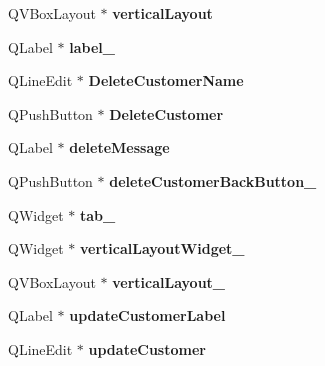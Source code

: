 \begin{DoxyCompactItemize}
\mbox{\label{class_ui___main_window_aecd96a04789fcfec3f98d80390ad8184}} 
Q\+V\+Box\+Layout $\ast$ {\bfseries vertical\+Layout}
\item 
\mbox{\label{class_ui___main_window_af183bfbfb9f38bbdd60caf92b15e23dc}} 
Q\+Label $\ast$ {\bfseries label\+\_}
\item 
\mbox{\label{class_ui___main_window_a0609806ecf470a0a506cff100a293f5c}} 
Q\+Line\+Edit $\ast$ {\bfseries Delete\+Customer\+Name}
\item 
\mbox{\label{class_ui___main_window_a5a892ebccf08983b3f64ebcf82b3c4ff}} 
Q\+Push\+Button $\ast$ {\bfseries Delete\+Customer}
\item 
\mbox{\label{class_ui___main_window_a50f57d40b6bc88b1f62d774daafa5ed0}} 
Q\+Label $\ast$ {\bfseries delete\+Message}
\item 
\mbox{\label{class_ui___main_window_a1bd01d0820b1695e67cf8a4ac5b920f9}} 
Q\+Push\+Button $\ast$ {\bfseries delete\+Customer\+Back\+Button\+\_}
\item 
\mbox{\label{class_ui___main_window_a41c7e77dd12b9445e13dbe8fb5ae1488}} 
Q\+Widget $\ast$ {\bfseries tab\+\_}
\item 
\mbox{\label{class_ui___main_window_a62b94f49d79e473da0f96d804b9c3af7}} 
Q\+Widget $\ast$ {\bfseries vertical\+Layout\+Widget\+\_}
\item 
\mbox{\label{class_ui___main_window_a0c01bad60d9f422a1258e710635a2f65}} 
Q\+V\+Box\+Layout $\ast$ {\bfseries vertical\+Layout\+\_}
\item 
\mbox{\label{class_ui___main_window_a4124a22ab8d4312bfd587b22c902dbee}} 
Q\+Label $\ast$ {\bfseries update\+Customer\+Label}
\item 
\mbox{\label{class_ui___main_window_a1339ece316972ffb68d7419fa8540094}} 
Q\+Line\+Edit $\ast$ {\bfseries update\+Customer}

\end{DoxyCompactItemize}
